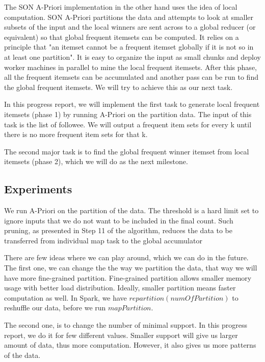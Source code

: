 \documentclass[11pt]{article}
\begin{document}
The SON A-Priori implementation in the other hand uses the idea of local computation.
SON A-Priori partitions the data and attempts to look at smaller subsets of the input and the local winners are sent across to a global reducer (or equivalent) so that global frequent itemsets can be computed.
It relies on a principle that "an itemset cannot be a frequent itemset globally if it is not so in at least one partition".
It is easy to organize the input as small chunks and deploy worker machines in parallel to mine the local frequent itemsets.
After this phase, all the frequent itemsets can be accumulated and another pass can be run to find the global frequent itemsets. We will try to achieve this as our next task.

In this progress report, we will implement the first task to generate local frequent itemsets (phase 1) by running A-Priori on the partition data.
The input of this task is the list of followee.
We will output a frequent item sets for every k until there is no more frequent item sets for that k.

The second major task is to find the global frequent winner itemset from local itemsets (phase 2), which we will do as the next milestone.\\

\subsection {Experiments}

We run A-Priori on the partition of the data.
The threshold is a hard limit set to ignore inputs that we do not want to be included in the final count.
Such pruning, as presented in Step 11 of the algorithm, reduces the data to be transferred from individual map task to the global accumulator

There are few ideas where we can play around, which we can do in the future.
The first one, we can change the the way we partition the data, that way we will have more fine-grained partition.
Fine-grained partition allows smaller memory usage with better load distribution.
Ideally, smaller partition means faster computation as well.
In Spark, we have $repartition(numOfPartition)$ to reshuffle our data, before we run $mapPartition$.

The second one, is to change the number of minimal support.
In this progress report, we do it for few different values.
Smaller support will give us larger amount of data, thus more computation.
However, it also gives us more patterns of the data.
\end{document}
